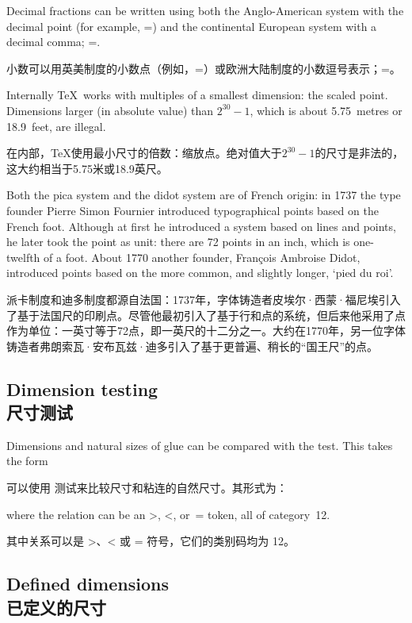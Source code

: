 Decimal fractions can be written using both the
Anglo-American system with the decimal point
(for example, \n{1in}=\n{72.27pt})
and the continental European system with a decimal
comma; \n{1in}=.

小数可以用英美制度的小数点（例如，\n{1in}=\n{72.27pt}）或欧洲大陆制度的小数逗号表示；\n{1in}=。

Internally \TeX\ works with multiples of a smallest 
dimension: the  scaled point.
Dimensions larger (in absolute value) than $2^{30}-1$,
which is about 5.75~metres or 18.9~feet, are illegal.

在内部，\TeX 使用最小尺寸的倍数：缩放点。绝对值大于$2^{30}-1$的尺寸是非法的，这大约相当于5.75米或18.9英尺。

Both the pica system and the didot system are of French
origin: in 1737 the type founder Pierre Simon Fournier
introduced typographical points based on the French foot.
Although at first he introduced a system based on lines and
points, he later took the point as unit:
there are 72 points in an inch,
which is one-twelfth of a foot. 
About 1770 another founder, Fran\c{c}ois Ambroise Didot, introduced
points based on the more common, and slightly longer,
`pied du roi'.

派卡制度和迪多制度都源自法国：1737年，字体铸造者皮埃尔·西蒙·福尼埃引入了基于法国尺的印刷点。尽管他最初引入了基于行和点的系统，但后来他采用了点作为单位：一英寸等于72点，即一英尺的十二分之一。大约在1770年，另一位字体铸造者弗朗索瓦·安布瓦兹·迪多引入了基于更普遍、稍长的“国王尺”的点。
 


\subsection{Dimension testing\\尺寸测试}

Dimensions and natural sizes of glue can be compared with
the  test. This takes the form

可以使用  测试来比较尺寸和粘连的自然尺寸。其形式为：
\begin{disp}\end{disp}
where the relation can be an \n>, \n<, or~\n= token, 
all of category~12.

其中关系可以是 \n>、\n< 或 \n= 符号，它们的类别码均为 12。


\subsection{Defined dimensions\\已定义的尺寸}


